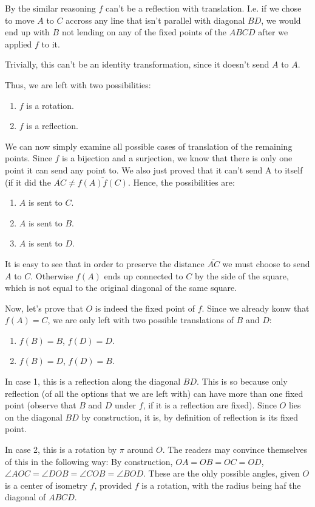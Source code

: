 \documentclass[11pt]{article}
\begin{document}
By the similar reasoning $f$ can't be a reflection with translation.  I.e. if
we chose to move $A$ to $C$ accross any line that isn't parallel with diagonal
$BD$, we would end up with $B$ not lending on any of the fixed points of the
$ABCD$ after we applied $f$ to it.

Trivially, this can't be an identity transformation, since it doesn't send
$A$ to $A$.

Thus, we are left with two possibilities:
\begin{enumerate}
\item $f$ is a rotation.
\item $f$ is a reflection.
\end{enumerate}

We can now simply examine all possible cases of translation of the remaining
points.  Since $f$ is a bijection and a surjection, we know that there is
only one point it can send any point to.  We also just proved that it can't
send A to itself (if it did the $\overline{AC} \neq \overline{f(A)f(C)}$.
Hence, the possibilities are:
\begin{enumerate}
\item $A$ is sent to $C$.
\item $A$ is sent to $B$.
\item $A$ is sent to $D$.
\end{enumerate}

It is easy to see that in order to preserve the distance $\overline{AC}$ we
must choose to send $A$ to $C$.  Otherwise $f(A)$ ends up connected to $C$
by the side of the square, which is not equal to the original diagonal of
the same square.

Now, let's prove that $O$ is indeed the fixed point of $f$.  Since we already
konw that $f(A)=C$, we are only left with two possible translations of $B$
and $D$:
\begin{enumerate}
\item $f(B)=B$, $f(D)=D$.
\item $f(B)=D$, $f(D)=B$.
\end{enumerate}

In case 1, this is a reflection along the diagonal $BD$.  This is so because
only reflection (of all the options that we are left with) can have more than
one fixed point (observe that $B$ and $D$ under $f$, if it is a reflection are
fixed).  Since $O$ lies on the diagonal $BD$ by construction, it is, by
definition of reflection is its fixed point.

In case 2, this is a rotation by $\pi$ around $O$.  The readers may convince
themselves of this in the following way:  By construction, $OA=OB=OC=OD$,
$\angle AOC = \angle DOB = \angle COB = \angle BOD$.  These are the ohly
possible angles, given $O$ is a center of isometry $f$, provided $f$ is
a rotation, with the radius being haf the diagonal of $ABCD$.
\end{document}
